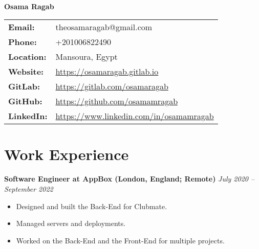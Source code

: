 \documentclass[a4paper]{article}
\newcommand{\hr}{\vspace{10pt}\noindent\hrulefill}
\newcommand{\headerdate}[2]{\textbf{#1} \hfill \textit{\footnotesize{#2}}}
\begin{document}
\begin{center}
	\vspace{2ex} \\
	\textbf{\huge{Osama Ragab}}
\end{center}

\begin{center}
	\vspace{2ex}
    \begin{tabular}{p{3cm}p{12cm}}
				\textbf{Email:} & theosamaragab@gmail.com \\
        \textbf{Phone:} & +201006822490 \\
				\textbf{Location:} & Mansoura, Egypt \\
				\textbf{Website:} & \url{https://osamaragab.gitlab.io} \\
				\textbf{GitLab:} & \url{https://gitlab.com/osamaragab} \\
				\textbf{GitHub:} & \url{https://github.com/osamamragab} \\
				\textbf{LinkedIn:} & \url{https://www.linkedin.com/in/osamamragab} \\
    \end{tabular}
\end{center}


\hr

\section*{Work Experience}

\headerdate
	{Software Engineer at AppBox (London, England; Remote)}
	{July 2020 -- September 2022}
\begin{itemize}
	\item Designed and built the Back-End for Clubmate.
	\item Managed servers and deployments.
	\item Worked on the Back-End and the Front-End for multiple projects.
\end{itemize}

\hr
\end{document}
